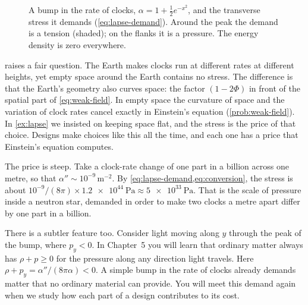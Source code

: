 \begin{figure}[htbp]
\centering
{}
\caption{A bump in the rate of clocks, $\alpha = 1 + \tfrac12 e^{-x^{2}}$, and the
transverse stress it demands (\cref{eq:lapse-demand}). Around the peak the
demand is a tension (shaded); on the flanks it is a pressure. The energy
density is zero everywhere.}
\label{fig:lapse-bump}
\end{figure}

 raises a fair question. The Earth makes clocks run at different
rates at different heights, yet empty space around the Earth contains no stress.
The difference is that the Earth's geometry also curves space: the factor
$(1 - 2\Phi)$ in front of the spatial part of \cref{eq:weak-field}. In empty
space the curvature of space and the variation of clock rates cancel exactly in
Einstein's equation (\cref{prob:weak-field}). In \cref{ex:lapse} we insisted on
keeping space flat, and the stress is the price of that choice. Designs make
choices like this all the time, and each one has a price that Einstein's
equation computes.

The price is steep. Take a clock-rate change of one part in a billion across one
metre, so that $\alpha'' \sim 10^{-9}\,\si{\metre^{-2}}$. By
\cref{eq:lapse-demand,eq:conversion}, the stress is about
$10^{-9}/(8\pi) \times \SI{1.2e44}{\pascal} \approx \SI{5e33}{\pascal}$. That is
the scale of pressure inside a neutron star, demanded in order to make two clocks
a metre apart differ by one part in a billion.

There is a subtler feature too. Consider light moving along $y$ through the
peak of the bump, where $p_{y} < 0$. In Chapter~5 you will learn that ordinary
matter always has $\rho + p \ge 0$ for the pressure along any direction light
travels. Here $\rho + p_{y} = \alpha''/(8\pi\alpha) < 0$. A simple bump in the rate
of clocks already demands matter that no ordinary material can provide. You
will meet this demand again when we study how each part of a design contributes
to its cost.

